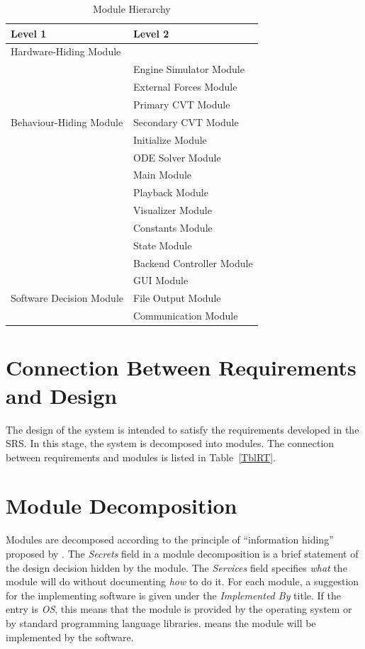 \documentclass[12pt, titlepage]{article}
\begin{document}
\begin{table}[h!]
\centering
\begin{tabular}{p{} p{}}
\toprule
\textbf{Level 1} & \textbf{Level 2}\\
\midrule

{Hardware-Hiding Module} & ~ \\
\midrule

\multirow{7}{0.3\textwidth}{Behaviour-Hiding Module}
& Engine Simulator Module\\
& External Forces Module\\
& Primary CVT Module\\
& Secondary CVT Module\\
& Initialize Module\\
& ODE Solver Module\\
& Main Module\\ 
& Playback Module\\
& Visualizer Module\\
& Constants Module\\
& State Module\\
& Backend Controller Module\\
\midrule

\multirow{3}{0.3\textwidth}{Software Decision Module}
& GUI Module\\
& File Output Module\\
& Communication Module\\
\bottomrule

\end{tabular}
\caption{Module Hierarchy}
\label{TblMH}
\end{table}

\section{Connection Between Requirements and Design} \label{SecConnection}

The design of the system is intended to satisfy the requirements developed in
the SRS. In this stage, the system is decomposed into modules. The connection
between requirements and modules is listed in Table~\ref{TblRT}.


\section{Module Decomposition} \label{SecMD}

Modules are decomposed according to the principle of ``information hiding''
proposed by \citet{ParnasEtAl1984}. The \emph{Secrets} field in a module
decomposition is a brief statement of the design decision hidden by the
module. The \emph{Services} field specifies \emph{what} the module will do
without documenting \emph{how} to do it. For each module, a suggestion for the
implementing software is given under the \emph{Implemented By} title. If the
entry is \emph{OS}, this means that the module is provided by the operating
system or by standard programming language libraries.  \emph{\progname{}} means the
module will be implemented by the \progname{} software.
\end{document}
